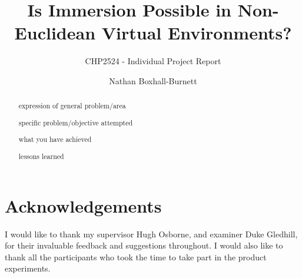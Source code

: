 \documentclass[abstract=on,12pt]{scrreprt}
\title{Is Immersion Possible in Non-Euclidean Virtual Environments?}
\subtitle{CHP2524 - Individual Project Report}
\author{Nathan Boxhall-Burnett}
\begin{document}
	\maketitle

	\renewcommand\thepage{}

	\begin{abstract}
		expression of general problem/area
		
		specific problem/objective attempted
		
		what you have achieved
		
		lessons learned
		
		

	\end{abstract}

	\section*{Acknowledgements}
		I would like to thank my supervisor Hugh Osborne, and examiner Duke Gledhill, for their invaluable feedback and suggestions throughout.
		I would also like to thank all the participants who took the time to take part in the product experiments.

	\tableofcontents

	\newpage
	\renewcommand\thepage{\arabic{page}}
\end{document}
